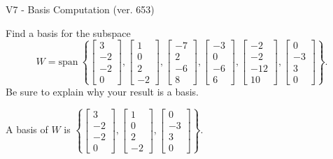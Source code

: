 \begin{exercise}
  \begin{exerciseTitle}V7 - Basis Computation (ver. 653)\end{exerciseTitle}
  \begin{exerciseStatement}
    Find a basis for the subspace 
\[W=\mathrm{span}\ \left\{\left[\begin{array}{r}
3 \\
-2 \\
-2 \\
0
\end{array}\right] , \left[\begin{array}{r}
1 \\
0 \\
2 \\
-2
\end{array}\right] , \left[\begin{array}{r}
-7 \\
2 \\
-6 \\
8
\end{array}\right] , \left[\begin{array}{r}
-3 \\
0 \\
-6 \\
6
\end{array}\right] , \left[\begin{array}{r}
-2 \\
-2 \\
-12 \\
10
\end{array}\right] , \left[\begin{array}{r}
0 \\
-3 \\
3 \\
0
\end{array}\right]\right\}.\]
 Be sure to explain why your result is a basis.


  \end{exerciseStatement}
  \begin{exerciseAnswer}
   A basis of \(W\) is  \(\left\{\left[\begin{array}{r}
3 \\
-2 \\
-2 \\
0
\end{array}\right] , \left[\begin{array}{r}
1 \\
0 \\
2 \\
-2
\end{array}\right] , \left[\begin{array}{r}
0 \\
-3 \\
3 \\
0
\end{array}\right]\right\}\).
  


  \end{exerciseAnswer}
\end{exercise}